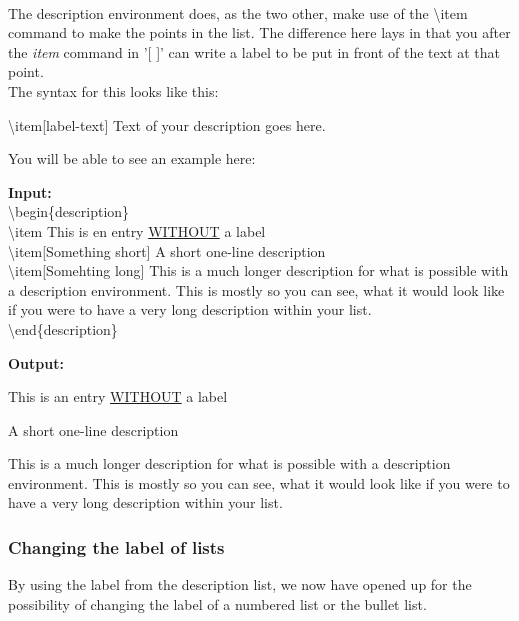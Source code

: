 \documentclass{article}
\newcommand{\jbs}[1]{\textbackslash{}#1} %
\begin{document}
 \\
\indent The description environment does, as the two other, make use of the \jbs{item}
command to make the points in the list. The difference here lays in that you after the 
\textit{item} command in '[ ]' can write a label to be put in front of the text at
that point. \\ 
The syntax for this looks like this:
\begin{center}
    \jbs{item}[label-text] Text of your description goes here.
\end{center}

You will be able to see an example here:
\begin{multicols}{2}
    \begin{minipage}{\linewidth}
        \textbf{Input: } \\
        \jbs{begin\{description\}} \\
            \jbs{item} This is en entry \underline{WITHOUT} a label \\
            \jbs{item}[Something short] A short one-line description\\
            \jbs{item}[Somehting long] This is a much longer description for what is possible with a description environment. This is mostly so you can see, what it would look like if you were to have a very long description within your list. \\
        \jbs{end}\{description\}
    \end{minipage}

    \begin{minipage}{\linewidth}
        \textbf{Output: } \\
        \begin{description}
            \item This is an entry \underline{WITHOUT} a label
            \item[Something short] A short one-line description
            \item[Something long] This is a much longer description for what is possible with a description environment. This is mostly so you can see, what it would look like if you were to have a very long description within your list.    
        \end{description}
    \end{minipage}
\end{multicols}

\subsubsection{Changing the label of lists}
By using the label from the description list, we now have opened up for the 
possibility of changing the label of a numbered list or the bullet list.
\end{document}
